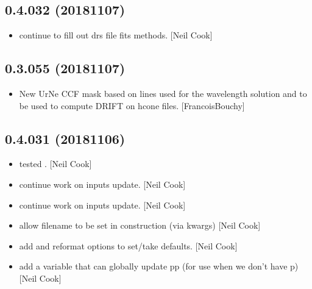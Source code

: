 \documentclass[a4paper,10pt,english]{report}
\begin{document}
\subsection{0.4.032 (2018\sphinxhyphen{}11\sphinxhyphen{}07)}
\label{\detokenize{misc/changelog:id286}}\begin{itemize}
\item {} 
 \sphinxhyphen{} continue to fill out drs file fits methods. {[}Neil
Cook{]}

\end{itemize}


\subsection{0.3.055 (2018\sphinxhyphen{}11\sphinxhyphen{}07)}
\label{\detokenize{misc/changelog:id287}}\begin{itemize}
\item {} 
New UrNe CCF mask based on lines used for the wavelength solution and
to be used to compute DRIFT on hcone files. {[}FrancoisBouchy{]}

\end{itemize}


\subsection{0.4.031 (2018\sphinxhyphen{}11\sphinxhyphen{}06)}
\label{\detokenize{misc/changelog:id288}}\begin{itemize}
\item {} 
 \sphinxhyphen{} tested . {[}Neil Cook{]}

\item {} 
 \sphinxhyphen{} continue work on inputs update. {[}Neil Cook{]}

\item {} 
 \sphinxhyphen{} continue work on inputs update. {[}Neil Cook{]}

\item {} 
 \sphinxhyphen{} allow filename to be set in construction (via kwargs)
{[}Neil Cook{]}

\item {} 
 \sphinxhyphen{} add and reformat options to set/take defaults.
{[}Neil Cook{]}

\item {} 
 \sphinxhyphen{} add a variable that can globally update pp (for use
when we don’t have p) {[}Neil Cook{]}

\end{itemize}
\end{document}

